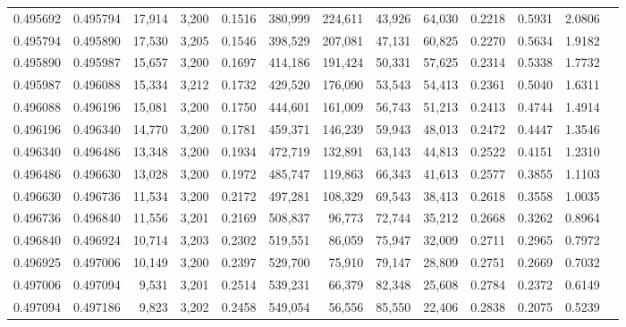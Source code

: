 \begin{tabular}{rrrrrrrrrrrrr}
0.495692 & 0.495794 & 17,914 & 3,200 &                                     0.1516 & 380,999 & 224,611 &  43,926 &  64,030 & 0.2218 & 0.5931 & 2.0806 \\
0.495794 & 0.495890 & 17,530 & 3,205 &                                     0.1546 & 398,529 & 207,081 &  47,131 &  60,825 & 0.2270 & 0.5634 & 1.9182 \\
0.495890 & 0.495987 & 15,657 & 3,200 &                                     0.1697 & 414,186 & 191,424 &  50,331 &  57,625 & 0.2314 & 0.5338 & 1.7732 \\
0.495987 & 0.496088 & 15,334 & 3,212 &                                     0.1732 & 429,520 & 176,090 &  53,543 &  54,413 & 0.2361 & 0.5040 & 1.6311 \\
0.496088 & 0.496196 & 15,081 & 3,200 &                                     0.1750 & 444,601 & 161,009 &  56,743 &  51,213 & 0.2413 & 0.4744 & 1.4914 \\
0.496196 & 0.496340 & 14,770 & 3,200 &                                     0.1781 & 459,371 & 146,239 &  59,943 &  48,013 & 0.2472 & 0.4447 & 1.3546 \\
0.496340 & 0.496486 & 13,348 & 3,200 &                                     0.1934 & 472,719 & 132,891 &  63,143 &  44,813 & 0.2522 & 0.4151 & 1.2310 \\
0.496486 & 0.496630 & 13,028 & 3,200 &                                     0.1972 & 485,747 & 119,863 &  66,343 &  41,613 & 0.2577 & 0.3855 & 1.1103 \\
0.496630 & 0.496736 & 11,534 & 3,200 &                                     0.2172 & 497,281 & 108,329 &  69,543 &  38,413 & 0.2618 & 0.3558 & 1.0035 \\
0.496736 & 0.496840 & 11,556 & 3,201 &                                     0.2169 & 508,837 &  96,773 &  72,744 &  35,212 & 0.2668 & 0.3262 & 0.8964 \\
0.496840 & 0.496924 & 10,714 & 3,203 &                                     0.2302 & 519,551 &  86,059 &  75,947 &  32,009 & 0.2711 & 0.2965 & 0.7972 \\
0.496925 & 0.497006 & 10,149 & 3,200 &                                     0.2397 & 529,700 &  75,910 &  79,147 &  28,809 & 0.2751 & 0.2669 & 0.7032 \\
0.497006 & 0.497094 &  9,531 & 3,201 &                                     0.2514 & 539,231 &  66,379 &  82,348 &  25,608 & 0.2784 & 0.2372 & 0.6149 \\
0.497094 & 0.497186 &  9,823 & 3,202 &                                     0.2458 & 549,054 &  56,556 &  85,550 &  22,406 & 0.2838 & 0.2075 & 0.5239 \\

\end{tabular}
